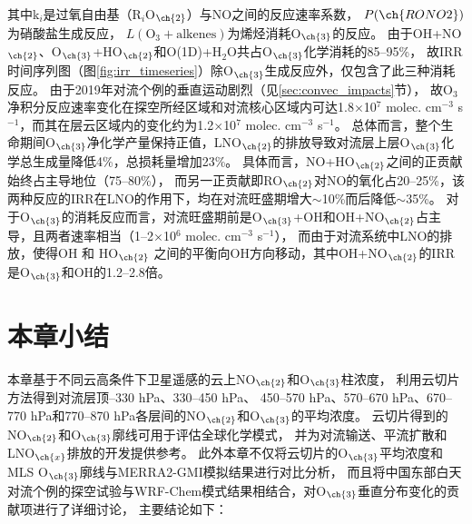 其中k$_i$是过氧自由基（R$_i$O$_{\ch{2}}$）与NO之间的反应速率系数，
$P(\ch{RONO2})$为硝酸盐生成反应，
$L(\mathrm{O_3+alkenes})$为烯烃消耗O$_{\ch{3}}$的反应。
由于OH+NO$_{\ch{2}}$、O$_{\ch{3}}$+HO$_{\ch{2}}$和O(1D)+H$_2$O共占O$_{\ch{3}}$化学消耗的85--95\%，
故IRR时间序列图（图\ref{fig:irr_timeseries}）除O$_{\ch{3}}$生成反应外，仅包含了此三种消耗反应。
由于2019年对流个例的垂直运动剧烈（见\ref{sec:convec_impacts}节），
故O$_3$净积分反应速率变化在探空所经区域和对流核心区域内可达1.8$\times$10$^7$ molec. cm$^{-3}$ s$^{-1}$，而其在层云区域内的变化约为1.2$\times$10$^7$ molec. cm$^{-3}$ s$^{-1}$。
总体而言，整个生命期间O$_{\ch{3}}$净化学产量保持正值，LNO$_{\ch{2}}$的排放导致对流层上层O$_{\ch{3}}$化学总生成量降低4\%，总损耗量增加23\%。
具体而言，NO+HO$_{\ch{2}}$之间的正贡献始终占主导地位（75--80\%），
而另一正贡献即RO$_{\ch{2}}$对NO的氧化占20--25\%，该两种反应的IRR在LNO的作用下，均在对流旺盛期增大$\sim$10\%而后降低$\sim$35\%。
对于O$_{\ch{3}}$的消耗反应而言，对流旺盛期前是O$_{\ch{3}}$+OH和OH+NO$_{\ch{2}}$占主导，且两者速率相当（1--2$\times$10$^6$ molec. cm$^{-3}$ s$^{-1}$），
而由于对流系统中LNO的排放，使得OH 和 HO$_{\ch{2}}$ 之间的平衡向OH方向移动，其中OH+NO$_{\ch{2}}$的IRR是O$_{\ch{3}}$和OH的1.2--2.8倍。


\section{本章小结}

本章基于不同云高条件下卫星遥感的云上NO$_{\ch{2}}$和O$_{\ch{3}}$柱浓度，
利用云切片方法得到对流层顶--330 hPa、330--450 hPa、
450--570 hPa、570--670 hPa、670--770 hPa和770--870 hPa各层间的NO$_{\ch{2}}$和O$_{\ch{3}}$的平均浓度。
云切片得到的NO$_{\ch{2}}$和O$_{\ch{3}}$廓线可用于评估全球化学模式，
并为对流输送、平流扩散和LNO$_{\ch{x}}$排放的开发提供参考。
此外本章不仅将云切片的O$_{\ch{3}}$平均浓度和MLS O$_{\ch{3}}$廓线与MERRA2-GMI模拟结果进行对比分析，
而且将中国东部白天对流个例的探空试验与WRF-Chem模式结果相结合，对O$_{\ch{3}}$垂直分布变化的贡献项进行了详细讨论，
主要结论如下：

